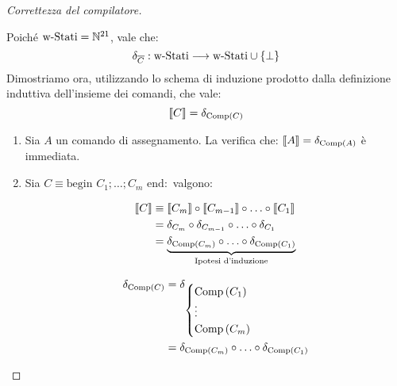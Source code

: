 \documentclass{lectures}
\begin{document}
\begin{proof}[Correttezza del compilatore]
\begin{enumerate}
\begin{multicols}{2}
            Poiché \(\text{w-Stati}=\mathbb{N}^{21}\), vale che:
            \[
                \delta_{\overline{C}}:\text{w-Stati}\longrightarrow \text{w-Stati}\cup\left\{\bot\right\}
            \]
            Dimostriamo ora, utilizzando lo schema di induzione prodotto dalla definizione induttiva dell'insieme dei comandi, che vale:
            \[
                \llbracket C\rrbracket = \delta_{\text{Comp}\left(C\right)}
            \]
        \end{multicols}
        \begin{enumerate}
            \item Sia \(A\) un comando di assegnamento. La verifica che: \(\llbracket A\rrbracket = \delta_{\text{Comp}\left(A\right)}\) è immediata.
            \item Sia \(C \equiv \text{begin }C_1;\ldots;C_m\text{ end}:\) valgono:
            \vspace{-1em}
            \begin{figure}
                \begin{subfigure}{0.49\textwidth}
                    \begin{align*}
                        \llbracket C\rrbracket &\equiv \llbracket C_m\rrbracket \circ \llbracket C_{m-1}\rrbracket \circ \ldots \circ \llbracket C_1\rrbracket\\
                        &= \delta_{C_m} \circ \delta_{C_{m-1}} \circ \ldots \circ \delta_{C_1}\\
                        &= \underbrace{\delta_{\text{Comp}\left(C_m\right)} \circ \ldots \circ \delta_{\text{Comp}\left(C_1\right)}}_{\text{Ipotesi d'induzione}}                
                    \end{align*}
                \end{subfigure}
                \begin{subfigure}{0.49\textwidth}
                    \begin{align*}
                        \delta_{\text{Comp}\left(C\right)} &= \delta_{\begin{cases}
                            \text{Comp}\left(C_1\right)\\
                            \vdots\\
                            \text{Comp}\left(C_m\right)
                        \end{cases}}\\ &= \delta_{\text{Comp}\left(C_m\right)} \circ \ldots \circ \delta_{\text{Comp}\left(C_1\right)}
                    \end{align*}
                \end{subfigure}
            \end{figure}

\end{enumerate}
\end{enumerate}
\end{proof}
\end{document}
